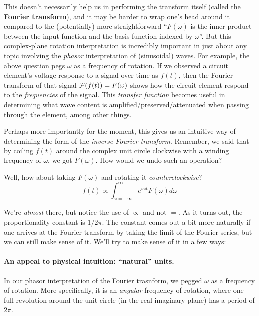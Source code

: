 \documentclass[letterpaper,12pt]{report}
\begin{document}
This doesn't necessarily help us in performing the transform
itself (called the \textbf{Fourier transform}),
and it may be harder to wrap one's head around it
compared to the (potentially) more straightforward
``\(F(\omega)\) is the inner product between the input function
and the basis function indexed by \(\omega\)''.
But this complex-plane rotation interpretation is
incredibly important in just about any topic involving
the \emph{phasor} interpretation of (sinusoidal) waves. 
For example, the above question
pegs \(\omega\) as a frequency of rotation. If we observed
a circuit element's 
voltage response to a signal over time as \(f(t)\),
then the Fourier transform of that signal 
\(\mathcal{F}(f(t)) = F(\omega)\) shows how the circuit element
respond to the \emph{frequencies} of the signal.
This \emph{transfer function} becomes useful in determining
what wave content is amplified/preserved/attenuated when
passing through the element, among other things.\par

Perhaps more importantly for the moment, this gives us
an intuitive way of determining the form of the 
\emph{inverse Fourier transform}.
Remember, we said that
by coiling \(f(t)\) around the complex unit circle clockwise
with a winding frequency of \(\omega\), we got \(F(\omega)\).
How would we undo such an operation?\par
Well, how about taking \(F(\omega)\) and rotating it
\emph{counterclockwise}?
\[f(t) \propto 
  \int_{\omega=-\infty}^{\infty} e^{i\omega t} F(\omega) d\omega \]

We're \emph{almost} there, but notice the use of \(\propto\)
and not \(=\).
As it turns out, the proportionality constant is \(1/2\pi\).
The constant comes out a bit more naturally if one arrives
at the Fourier transform by taking the limit of
the Fourier series,
but we can still make sense of it.
We'll try to make sense of it in a few ways:

\paragraph{An appeal to physical intuition: ``natural'' units.}

In our phasor interpretation of the Fourier trasnform,
we pegged \(\omega\) as a frequency of rotation.
More specifically, it is an \emph{angular} frequency of rotation,
where one full revolution around the unit circle
(in the real-imaginary plane)
has a period of \(2\pi\).\par
\end{document}
